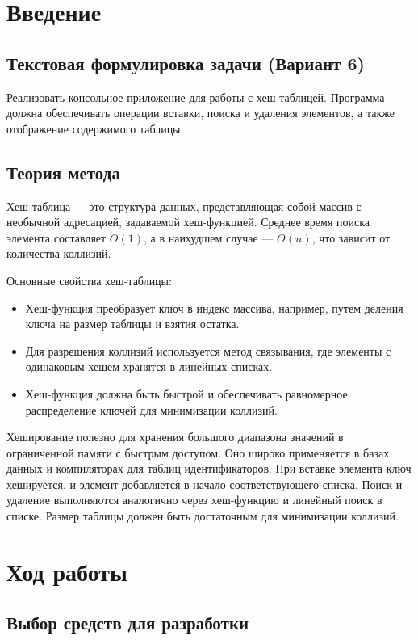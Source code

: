 \documentclass[12pt,a4paper]{scrartcl}
\begin{document}
\section{Введение}
\label{sec:intro}

\subsection{Текстовая формулировка задачи (Вариант 6)}
Реализовать консольное приложение для работы с хеш-таблицей. Программа должна обеспечивать операции вставки, поиска и удаления элементов, а также отображение содержимого таблицы.

\subsection{Теория метода}

Хеш-таблица — это структура данных, представляющая собой массив с необычной адресацией, задаваемой хеш-функцией. Среднее время поиска элемента составляет \( O(1) \), а в наихудшем случае — \( O(n) \), что зависит от количества коллизий.

Основные свойства хеш-таблицы:
\begin{itemize}
  \item Хеш-функция преобразует ключ в индекс массива, например, путем деления ключа на размер таблицы и взятия остатка.
  \item Для разрешения коллизий используется метод связывания, где элементы с одинаковым хешем хранятся в линейных списках.
  \item Хеш-функция должна быть быстрой и обеспечивать равномерное распределение ключей для минимизации коллизий.
\end{itemize}

Хеширование полезно для хранения большого диапазона значений в ограниченной памяти с быстрым доступом. Оно широко применяется в базах данных и компиляторах для таблиц идентификаторов. При вставке элемента ключ хешируется, и элемент добавляется в начало соответствующего списка. Поиск и удаление выполняются аналогично через хеш-функцию и линейный поиск в списке. Размер таблицы должен быть достаточным для минимизации коллизий.

\section{Ход работы}
\subsection{Выбор средств для разработки}
\end{document}
